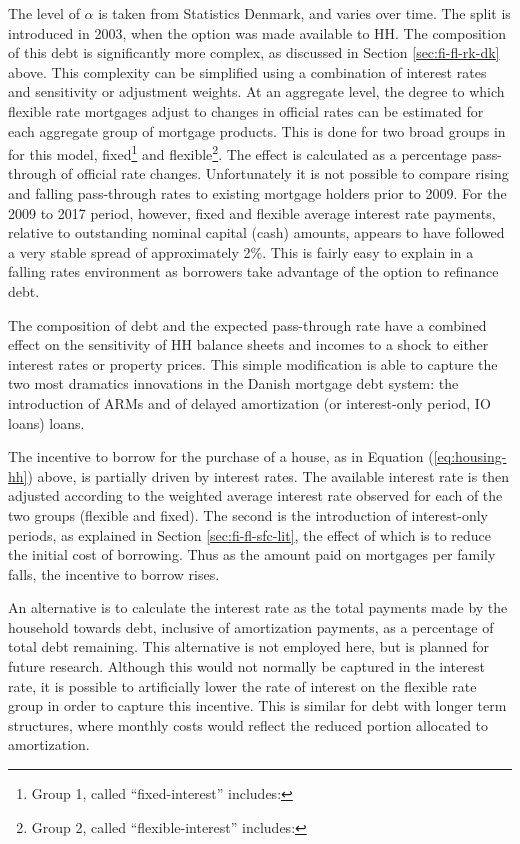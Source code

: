 \documentclass[
]{book}
\begin{document}
The level of \(\alpha\) is taken from Statistics Denmark, and varies over time. The split is introduced in 2003, when the option was made available to HH. The composition of this debt is significantly more complex, as discussed in Section \ref{sec:fi-fl-rk-dk}
above. This complexity can be simplified using a combination of interest rates and sensitivity or adjustment weights. At an aggregate level, the degree to which flexible rate mortgages adjust to changes in official rates can be estimated for each aggregate group of mortgage products. This is done for two broad groups in for this model, fixed\footnote{Group 1, called ``fixed-interest'' includes:} and flexible\footnote{Group 2, called ``flexible-interest'' includes:}. The effect is calculated as a percentage pass-through of official rate changes. Unfortunately it is not possible to compare rising and falling pass-through rates to existing mortgage holders prior to 2009. For the 2009 to 2017 period, however, fixed and flexible average interest rate payments, relative to outstanding nominal capital (cash) amounts, appears to have followed a very stable spread of approximately 2\%. This is fairly easy to explain in a falling rates environment as borrowers take advantage of the option to refinance debt.

The composition of debt and the expected pass-through rate have a combined effect on
the sensitivity of HH balance sheets and incomes to a shock to either interest rates or
property prices. This simple modification is able to capture the two most dramatics
innovations in the Danish mortgage debt system: the introduction of ARMs and of
delayed amortization (or interest-only period, IO loans) loans.

The incentive to borrow for the purchase of a house, as in Equation (\ref{eq:housing-hh}) above, is
partially driven by interest rates. The available interest rate is then adjusted according to
the weighted average interest rate observed for each of the two groups (flexible and fixed).
The second is the introduction of interest-only periods, as explained in Section \ref{sec:fi-fl-sfc-lit},
the effect of which is to reduce the initial cost of borrowing. Thus as the amount paid on mortgages
per family falls, the incentive to borrow rises.

An alternative is to calculate the interest rate as the total payments made by the
household towards debt, inclusive of amortization payments, as a percentage of total
debt remaining. This alternative is not employed here, but is planned for future research.
Although this would not normally be captured in the interest rate, it
is possible to artificially lower the rate of interest on the flexible rate group in
order to capture this incentive. This is similar for debt with longer term structures,
where monthly costs would reflect the reduced portion allocated to amortization.
\end{document}
